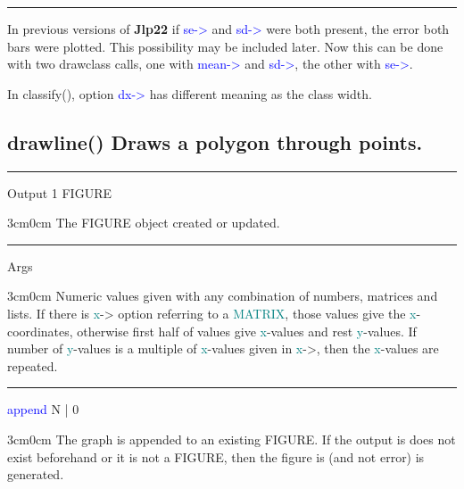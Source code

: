 \vspace{-7mm} \rule{5cm}{0.1pt} 
\onehalfspacing 
\begin{note} 
In previous versions of \textbf{Jlp22} if \textcolor{blue}{se->} and \textcolor{blue}{sd->} were both present, the error 
both bars were plotted. This possibility may be included later. Now this can be done with two drawclass calls, 
one with \textcolor{blue}{mean->} and \textcolor{blue}{sd->}, the other with \textcolor{blue}{se->}. 
\end{note} 
\begin{note} 
In \textcolor{VioletRed}{classify}(), option \textcolor{blue}{dx->} has different meaning as the class width. 
\end{note} 
\subsection{\textcolor{VioletRed}{drawline}() Draws a polygon through points.} 
\label{drawline} 
\vspace{0.3cm} 
\hrule 
\vspace{0.3cm} 
\noindent Output  \tabto{3cm}  1 \tabto{5cm}   FIGURE  \tabto{7cm} 
\begin{changemargin}{3cm}{0cm} 
\noindent  The FIGURE object created or updated. 
\end{changemargin} 
\vspace{0.3cm} 
\hrule 
\vspace{0.3cm} 
\noindent Args \tabto{3cm}  \tabto{5cm}    \tabto{7cm} 
\begin{changemargin}{3cm}{0cm} 
\noindent Numeric values given with any combination of numbers, matrices and lists. If there is 
\textcolor{teal}{x}-> option referring to a \textcolor{teal}{MATRIX}, those values give the \textcolor{teal}{x}-coordinates, otherwise 
first half of values give \textcolor{teal}{x}-values and rest \textcolor{teal}{y}-values. If number of \textcolor{teal}{y}-values is a multiple 
of \textcolor{teal}{x}-values given in \textcolor{teal}{x}->, then the \textcolor{teal}{x}-values are repeated. 
 
\end{changemargin} 
\vspace{0.3cm} 
\hrule 
\vspace{0.3cm} 
\noindent \textcolor{blue}{append} \tabto{3cm} N | 0  \tabto{5cm}    \tabto{7cm} 
\begin{changemargin}{3cm}{0cm} 
\noindent  The graph is appended to an existing FIGURE. If the output is does not exist 
beforehand or it is not a FIGURE, then the figure is (and not error) is generated. 
\end{changemargin} 
